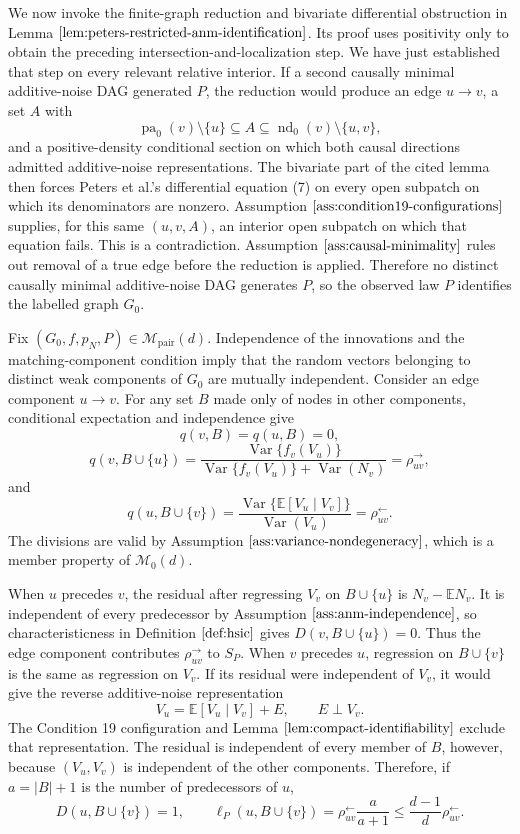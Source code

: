 We now invoke the finite-graph reduction and bivariate differential obstruction in Lemma \(\ref{lem:peters-restricted-anm-identification}\).  Its proof uses positivity only to obtain the preceding intersection-and-localization step.  We have just established that step on every relevant relative interior.  If a second causally minimal additive-noise DAG generated \(P\), the reduction would produce an edge \(u\to v\), a set \(A\) with
\[
 \operatorname{pa}_0(v)\setminus\{u\}\subseteq A
 \subseteq\operatorname{nd}_0(v)\setminus\{u,v\},
\]
and a positive-density conditional section on which both causal directions admitted additive-noise representations.  The bivariate part of the cited lemma then forces Peters et al.'s differential equation (7) on every open subpatch on which its denominators are nonzero.  Assumption \(\ref{ass:condition19-configurations}\) supplies, for this same \((u,v,A)\), an interior open subpatch on which that equation fails.  This is a contradiction.  Assumption \(\ref{ass:causal-minimality}\) rules out removal of a true edge before the reduction is applied.  Therefore no distinct causally minimal additive-noise DAG generates \(P\), so the observed law \(P\) identifies the labelled graph \(G_0\).

Fix \((G_0,f,p_N,P)\in\mathcal M_{\mathrm{pair}}(d)\).  Independence of the innovations and the matching-component condition imply that the random vectors belonging to distinct weak components of \(G_0\) are mutually independent.  Consider an edge component \(u\to v\).  For any set \(B\) made only of nodes in other components, conditional expectation and independence give
\[
 q(v,B)=q(u,B)=0,
\]
\[
 q(v,B\cup\{u\})
 =\frac{\operatorname{Var}\{f_v(V_u)\}}
 {\operatorname{Var}\{f_v(V_u)\}+\operatorname{Var}(N_v)}
 =\rho^{\to}_{uv},
\]
and
\[
 q(u,B\cup\{v\})
 =\frac{\operatorname{Var}\{\mathbb E[V_u\mid V_v]\}}
 {\operatorname{Var}(V_u)}
 =\rho^{\leftarrow}_{uv}.
\]
The divisions are valid by Assumption \(\ref{ass:variance-nondegeneracy}\), which is a member property of \(\mathcal M_0(d)\).

When \(u\) precedes \(v\), the residual after regressing \(V_v\) on \(B\cup\{u\}\) is \(N_v-\mathbb E N_v\).  It is independent of every predecessor by Assumption \(\ref{ass:anm-independence}\), so characteristicness in Definition \(\ref{def:hsic}\) gives \(D(v,B\cup\{u\})=0\).  Thus the edge component contributes \(\rho^{\to}_{uv}\) to \(S_P\).  When \(v\) precedes \(u\), regression on \(B\cup\{v\}\) is the same as regression on \(V_v\).  If its residual were independent of \(V_v\), it would give the reverse additive-noise representation
\[
 V_u=\mathbb E[V_u\mid V_v]+E,
 \qquad E\perp V_v.
\]
The Condition 19 configuration and Lemma \(\ref{lem:compact-identifiability}\) exclude that representation.  The residual is independent of every member of \(B\), however, because \((V_u,V_v)\) is independent of the other components.  Therefore, if \(a=|B|+1\) is the number of predecessors of \(u\),
\[
 D(u,B\cup\{v\})=1,
 \qquad
 \ell_P(u,B\cup\{v\})
 =\rho^{\leftarrow}_{uv}\frac{a}{a+1}
 \le \frac{d-1}{d}\rho^{\leftarrow}_{uv}.
\]

